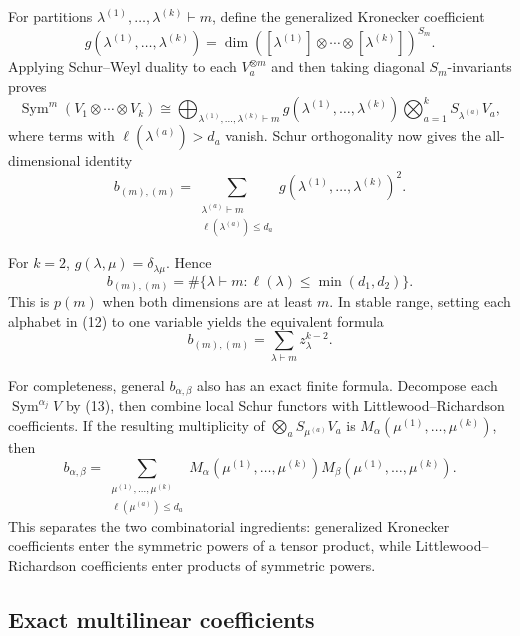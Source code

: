 \documentclass[10pt]{article}
\newcommand{\Sym}{\operatorname{Sym}}
\begin{document}
For partitions $\lambda^{(1)},\ldots,\lambda^{(k)}\vdash m$, define the
generalized Kronecker coefficient
\[
 g(\lambda^{(1)},\ldots,\lambda^{(k)})
 =\dim\left([\lambda^{(1)}]\otimes\cdots\otimes[\lambda^{(k)}]\right)^{S_m}.
\]
Applying Schur--Weyl duality to each $V_a^{\otimes m}$ and then taking
diagonal $S_m$-invariants proves
\begin{equation}
 \Sym^m(V_1\otimes\cdots\otimes V_k)
 \cong\bigoplus_{\lambda^{(1)},\ldots,\lambda^{(k)}\vdash m}
 g(\lambda^{(1)},\ldots,\lambda^{(k)})
 \bigotimes_{a=1}^kS_{\lambda^{(a)}}V_a,
\end{equation}
where terms with $\ell(\lambda^{(a)})>d_a$ vanish. Schur orthogonality now
gives the all-dimensional identity
\begin{equation}
 \boxed{b_{(m),(m)}=
 \sum_{\substack{\lambda^{(a)}\vdash m\\
                  \ell(\lambda^{(a)})\le d_a}}
 g(\lambda^{(1)},\ldots,\lambda^{(k)})^2.}
\end{equation}

For $k=2$, $g(\lambda,\mu)=\delta_{\lambda\mu}$. Hence
\begin{equation}
 \boxed{b_{(m),(m)}=
 \#\{\lambda\vdash m:\ell(\lambda)\le\min(d_1,d_2)\}.}
\end{equation}
This is $p(m)$ when both dimensions are at least $m$. In stable range, setting
each alphabet in (12) to one variable yields the equivalent formula
\begin{equation}
 \boxed{b_{(m),(m)}=\sum_{\lambda\vdash m}z_\lambda^{k-2}.}
\end{equation}

For completeness, general $b_{\alpha,\beta}$ also has an exact finite formula.
Decompose each $\Sym^{\alpha_j}V$ by (13), then combine local Schur functors
with Littlewood--Richardson coefficients. If the resulting multiplicity of
$\bigotimes_aS_{\mu^{(a)}}V_a$ is $M_\alpha(\mu^{(1)},\ldots,\mu^{(k)})$,
then
\begin{equation}
 b_{\alpha,\beta}=\sum_{\substack{\mu^{(1)},\ldots,\mu^{(k)}\\
                          \ell(\mu^{(a)})\le d_a}}
 M_\alpha(\mu^{(1)},\ldots,\mu^{(k)})
 M_\beta(\mu^{(1)},\ldots,\mu^{(k)}).
\end{equation}
This separates the two combinatorial ingredients: generalized Kronecker
coefficients enter the symmetric powers of a tensor product, while
Littlewood--Richardson coefficients enter products of symmetric powers.

\subsection{Exact multilinear coefficients}
\end{document}

